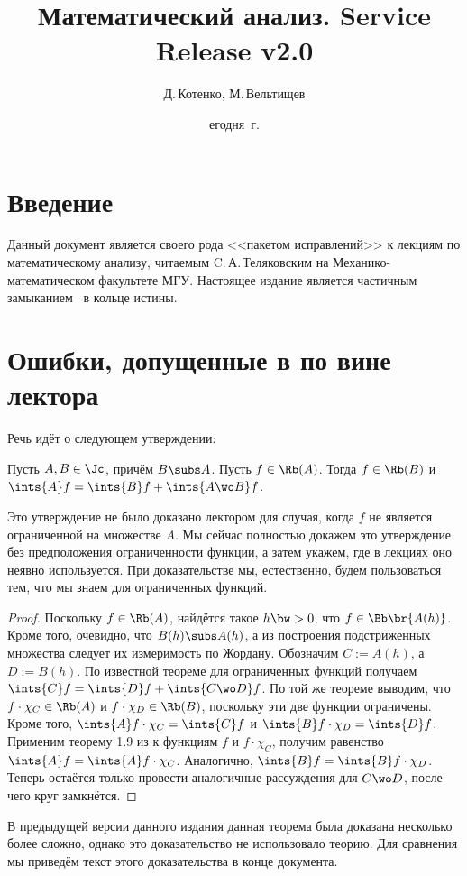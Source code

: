 \documentclass[a4paper]{article}
\title{Математический анализ. Service Release v2.0}
\author{Д.\,Котенко, М.\,Вельтищев}
\date{егодня~г.}
\begin{document}
\maketitle

\section{Введение}
Данный документ является своего рода <<пакетом исправлений>> к лекциям по математическому анализу,
читаемым C.\,А.\,Теляковским на Механико-математическом факультете МГУ. Настоящее издание является
частичным замыканием~\cite{lectures} в кольце истины.

\section{Ошибки, допущенные в \cite{lectures} по вине лектора}
Речь идёт о следующем утверждении:

\begin{theorem}
Пусть $A, B \in \Jc$, причём $B \subs A$. Пусть $f \in \Rb(A)$. Тогда $f \in \Rb(B)$ и
$\ints{A} f = \ints{B} f + \ints{A \wo B} f$.
\end{theorem}
Это утверждение не было доказано лектором для случая, когда $f$ не является ограниченной на
множестве $A$. Мы сейчас полностью докажем это утверждение без предположения ограниченности
функции, а затем укажем, где в лекциях оно неявно используется. При доказательстве мы, естественно,
будем пользоваться тем, что мы знаем для ограниченных функций.

\begin{proof}
Поскольку $f \in \Rb(A)$, найдётся такое $h\bw>0$, что $f \in \Bb\br{A(h)}$. Кроме того, очевидно,
что $B(h) \subs A(h)$, а из построения подстриженных множества следует их измеримость по Жордану.
Обозначим $C := A(h)$, а $D := B(h)$. По известной теореме для ограниченных функций получаем
$\ints{C} f = \ints{D} f + \ints{C\wo D}f$. По той же теореме выводим, что
$f \cdot \chi_C \in \Rb(A)$ и $f \cdot \chi_D \in \Rb(B)$, поскольку эти две функции
ограничены. Кроме того, $\ints{A} f \cdot \chi_C = \ints{C} f$ и $\ints{B} f \cdot \chi_D = \ints{D} f$.
Применим теорему 1.9 из \cite{lectures} к функциям $f$ и $f \cdot \chi_C$, получим
равенство $\ints{A} f = \ints{A} f \cdot \chi_C$. Аналогично, $\ints{B} f = \ints{B} f \cdot \chi_D$.
Теперь остаётся только провести аналогичные рассуждения для $C\wo D$, после чего круг замкнётся.
\end{proof}

\begin{note}
В предыдущей версии данного издания \cite{patch} данная теорема была доказана несколько более сложно,
однако это доказательство не использовало теорию. Для сравнения мы приведём текст этого доказательства
в конце документа.
\end{note}
\end{document}
